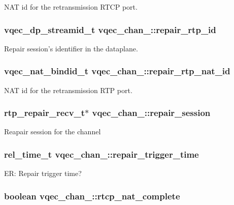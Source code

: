NAT id for the retransmission RTCP port. 
\subsubsection{\setlength{\rightskip}{0pt plus 5cm}vqec\_\-dp\_\-streamid\_\-t \bf{vqec\_\-chan\_\-::repair\_\-rtp\_\-id}}\label{structvqec__chan___17c110311029ad51d8eb84d218e87d21}


Repair session's identifier in the dataplane. 
\subsubsection{\setlength{\rightskip}{0pt plus 5cm}vqec\_\-nat\_\-bindid\_\-t \bf{vqec\_\-chan\_\-::repair\_\-rtp\_\-nat\_\-id}}\label{structvqec__chan___6db557f8714fe6ff3b7674bda0dd3b5e}


NAT id for the retransmission RTP port. 
\subsubsection{\setlength{\rightskip}{0pt plus 5cm}\bf{rtp\_\-repair\_\-recv\_\-t}$\ast$ \bf{vqec\_\-chan\_\-::repair\_\-session}}\label{structvqec__chan___1c7a68490f8448613486671b83e80fd7}


Reapair session for the channel 
\subsubsection{\setlength{\rightskip}{0pt plus 5cm}rel\_\-time\_\-t \bf{vqec\_\-chan\_\-::repair\_\-trigger\_\-time}}\label{structvqec__chan___7936acba05ea4703700dfe6ad61f9c5c}


ER: Repair trigger time? 
\subsubsection{\setlength{\rightskip}{0pt plus 5cm}boolean \bf{vqec\_\-chan\_\-::rtcp\_\-nat\_\-complete}}\label{structvqec__chan___3781b6e955832f1ffbc079ccde8e838e}


